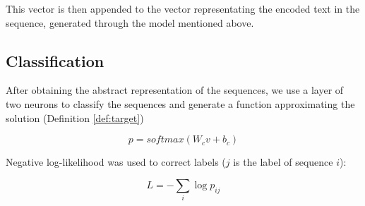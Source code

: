 This vector is then appended to the vector representating the encoded text in the sequence, generated through the model mentioned above. 


\subsection{Classification}
After obtaining the abstract representation of the sequences, 
we use a layer of two neurons to classify the sequences and 
generate a function approximating the solution (Definition \ref{def:target}) 

\begin{equation*}
	p = softmax(W_c v + b_c)
\end{equation*}

Negative log-likelihood was used to correct labels ($j$ is the label of sequence $i$): 

\begin{equation*}
	L = - \sum_{i} \log{p_{ij}}
\end{equation*}

